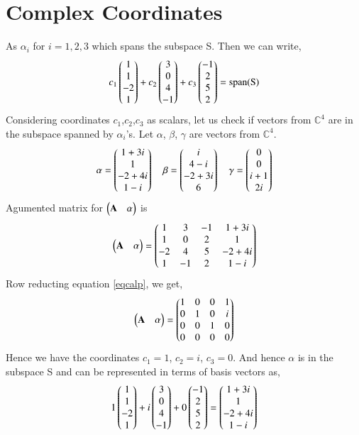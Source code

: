 \documentclass[journal,12pt,twocolumn]{IEEEtran}
\begin{document}
\section{Complex Coordinates}
As $\alpha_i$ for $i=1,2,3$ which spans the subspace S. Then we can write,
\begin{align}
c_1\begin{pmatrix}1\\1\\-2\\1\end{pmatrix}+c_2\begin{pmatrix}3\\0\\4\\-1\end{pmatrix}+c_3\begin{pmatrix}-1\\2\\5\\2\end{pmatrix}=\text{span(S)}
\end{align}
Considering coordinates $c_1$,$c_2$,$c_3$ as scalars, let us check if vectors from $\mathbb{C}^4$ are in the subspace spanned by $\alpha_i$'s.
Let $\alpha$, $\beta$, $\gamma$ are vectors from $\mathbb{C}^4$.
\begin{align}
\alpha=\begin{pmatrix}1+3i\\1\\-2+4i\\1-i\end{pmatrix}\quad
\beta=\begin{pmatrix}i\\4-i\\-2+3i\\6\end{pmatrix}\quad
\gamma=\begin{pmatrix}0\\0\\i+1\\2i\end{pmatrix}
\end{align}
 Agumented matrix for $\begin{pmatrix}\mathbf{A}&\alpha\end{pmatrix}$ is
\begin{align}\label{eqcalp}
\begin{pmatrix}\mathbf{A}&\alpha\end{pmatrix}=\begin{pmatrix}1&3&-1&1+3i\\1&0&2&1\\-2&4&5&-2+4i\\1&-1&2&1-i\end{pmatrix} 
\end{align}
Row reducting equation \eqref{eqcalp}, we get,
\begin{align}
\begin{pmatrix}\mathbf{A}&\alpha\end{pmatrix}=\begin{pmatrix}1&0&0&1\\0&1&0&i\\0&0&1&0\\0&0&0&0\end{pmatrix}
\end{align}
Hence we have the coordinates $c_1=1$, $c_2=i$, $c_3=0$. And hence $\alpha$ is in the subspace S and can be represented in terms of basis vectors as,
\begin{align}
1\begin{pmatrix}1\\1\\-2\\1\end{pmatrix}+i\begin{pmatrix}3\\0\\4\\-1\end{pmatrix}+0\begin{pmatrix}-1\\2\\5\\2\end{pmatrix}=\begin{pmatrix}1+3i\\1\\-2+4i\\1-i\end{pmatrix}
\end{align}
\end{document}
